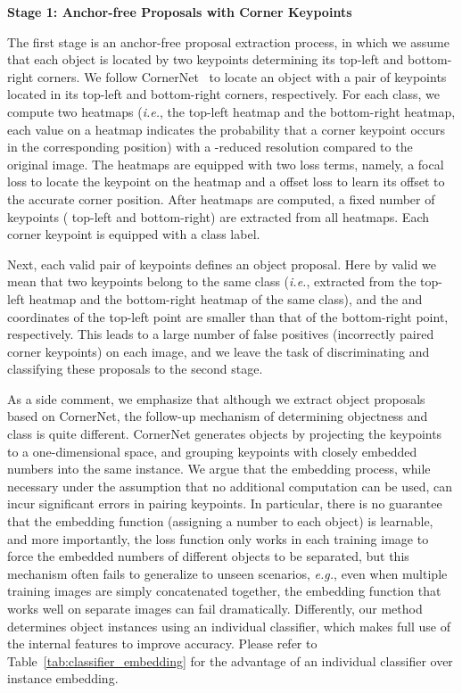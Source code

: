 \documentclass[runningheads]{llncs}
\begin{document}
\noindent\quad\textbf{Stage 1: Anchor-free Proposals with Corner Keypoints}

The first stage is an anchor-free proposal extraction process, in which we assume that each object is located by two keypoints determining its top-left and bottom-right corners. We follow CornerNet~\cite{law2018cornernet} to locate an object with a pair of keypoints located in its top-left and bottom-right corners, respectively. For each class, we compute two heatmaps (\textit{i.e.}, the top-left heatmap and the bottom-right heatmap, each value on a heatmap indicates the probability that a corner keypoint occurs in the corresponding position) with a -reduced resolution compared to the original image. The heatmaps are equipped with two loss terms, namely, a focal loss  to locate the keypoint on the heatmap and a offset loss  to learn its offset to the accurate corner position. After heatmaps are computed, a fixed number of keypoints ( top-left and  bottom-right) are extracted from all heatmaps. Each corner keypoint is equipped with a class label.

Next, each valid pair of keypoints defines an object proposal. Here by valid we mean that two keypoints belong to the same class (\textit{i.e.}, extracted from the top-left heatmap and the bottom-right heatmap of the same class), and the  and  coordinates of the top-left point are smaller than that of the bottom-right point, respectively. This leads to a large number of false positives (incorrectly paired corner keypoints) on each image, and we leave the task of discriminating and classifying these proposals to the second stage.

As a side comment, we emphasize that although we extract object proposals based on CornerNet, the follow-up mechanism of determining objectness and class is quite different. CornerNet generates objects by projecting the keypoints to a one-dimensional space, and grouping keypoints with closely embedded numbers into the same instance. We argue that the embedding process, while necessary under the assumption that no additional computation can be used, can incur significant errors in pairing keypoints. In particular, there is no guarantee that the embedding function (assigning a number to each object) is learnable, and more importantly, the loss function only works in each training image to force the embedded numbers of different objects to be separated, but this mechanism often fails to generalize to unseen scenarios, \textit{e.g.}, even when multiple training images are simply concatenated together, the embedding function that works well on separate images can fail dramatically. Differently, our method determines object instances using an individual classifier, which makes full use of the internal features to improve accuracy. Please refer to Table~\ref{tab:classifier_embedding} for the advantage of an individual classifier over instance embedding.
\end{document}
